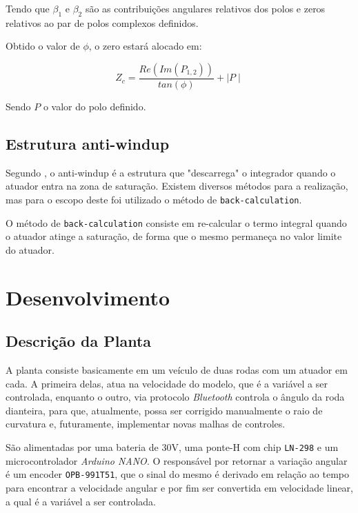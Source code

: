 \documentclass[conference,harvard,brazil,english]{sbatex}
\begin{document}
                Tendo que $\beta_1$ e $\beta_2$ são as contribuições angulares relativos dos polos e zeros relativos ao par de polos complexos definidos.
                
                Obtido o valor de $\phi$, o zero estará alocado em:
                
                \begin{equation}
                    \label{equ:polo}
                    Z_c = \frac{Re(Im(P_{1,2}))}{tan(\phi)} + \mid P \mid
                \end{equation}
            
            Sendo $P$ o valor do polo definido.
            
            \subsection{Estrutura anti-windup}
                \label{sub:antiwindup}
                Segundo \cite{silva_2000}, o anti-windup é a estrutura que "descarrega" o integrador quando o atuador entra na zona de saturação. Existem diversos métodos para a realização, mas para o escopo deste foi utilizado o método de \texttt{back-calculation}.
                
                O método de \texttt{back-calculation} consiste em re-calcular o termo integral quando o atuador atinge a saturação, de forma que o mesmo permaneça no valor limite do atuador.
        
    \section{Desenvolvimento}
    
        \subsection{Descrição da Planta }
        
            A planta consiste basicamente em um veículo de duas rodas com um atuador em cada. A primeira delas, atua na velocidade do modelo, que é a variável a ser controlada, enquanto o outro, via protocolo \textit{Bluetooth} controla o ângulo da roda dianteira, para que, atualmente, possa ser corrigido manualmente o raio de curvatura e, futuramente, implementar novas malhas de controles.
            
            São alimentadas por uma bateria de 30V, uma ponte-H com chip \texttt{LN-298} e um microcontrolador \textit{Arduino NANO}. O responsável por retornar a variação angular é um encoder \texttt{OPB-991T51}, que o sinal do mesmo é derivado em relação ao tempo para encontrar a velocidade angular e por fim ser convertida em velocidade linear, a qual é a variável a ser controlada.
            
\end{document}
